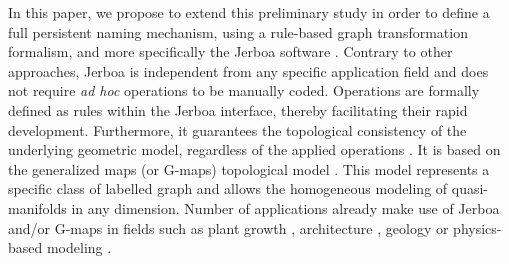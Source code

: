 
In this paper, we propose to extend this preliminary study in order to define a full persistent naming mechanism, using a rule-based graph transformation formalism, and more specifically the Jerboa software \cite{belhaouari2014jerboa}.
Contrary to other approaches, Jerboa is independent from any specific application field and does not require \textit{ad hoc} operations to be manually coded. Operations are formally defined as rules within the Jerboa interface, thereby facilitating their rapid development. Furthermore, it guarantees the topological %
consistency of the underlying geometric model, regardless of the applied operations \cite{arnould2022preserving}. It is based on the generalized maps (or G-maps) topological model \cite{lienhardt1991topological, Damiand-Lienhardt14}. This model represents a specific class of labelled graph and allows the
homogeneous modeling of quasi-manifolds in any dimension. Number of
applications already make use of Jerboa and/or G-maps in
fields such as plant growth \cite{bohl2015modeling}, architecture \cite{horna2009consistency, arroyo2015dimension}, geology \cite{halbwachs2000generalized}  or physics-based modeling  \cite{salah2017general}. 



